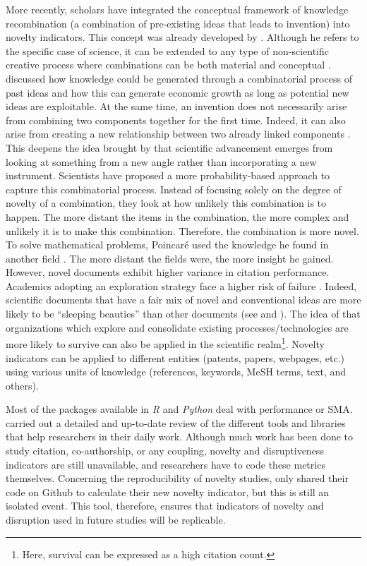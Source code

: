 More recently, scholars have integrated the conceptual framework of knowledge recombination (a combination of pre-existing ideas that leads to invention) into novelty indicators. This concept was already developed by \cite{poincare1910mathematical}. Although he refers to the specific case of science, it can be extended to any type of non-scientific creative process where combinations can be both material and conceptual \citep{winter1982evolutionary}. \cite{weitzman1998recombinant} discussed how knowledge could be generated through a combinatorial process of past ideas and how this can generate economic growth as long as potential new ideas are exploitable. At the same time, an invention does not necessarily arise from combining two components together for the first time. Indeed, it can also arise from creating a new relationship between two already linked components \citep{schumpeter1939business, henderson1990architectural}. This deepens the idea brought by \cite{jacob1977evolution} that scientific advancement emerges from looking at something from a new angle rather than incorporating a new instrument. Scientists have proposed a more probability-based approach to capture this combinatorial process. Instead of focusing solely on the degree of novelty of a combination, they look at how unlikely this combination is to happen. The more distant the items in the combination, the more complex and unlikely it is to make this combination. Therefore, the combination is more novel. To solve mathematical problems, Poincaré used the knowledge he found in another field \citep{poincare1910mathematical}. The more distant the fields were, the more insight he gained. However, novel documents exhibit higher variance in citation performance. Academics adopting an exploration strategy face a higher risk of failure \citep{fleming2001recombinant,foster2015tradition,wang2017bias, ocde}. Indeed, scientific documents that have a fair mix of novel and conventional ideas are more likely to be ``sleeping beauties'' than other documents (see \cite{ke2015defining} and \cite{wang2017bias}). The idea of \cite{march1991exploration} that organizations which explore and consolidate existing processes/technologies are more likely to survive can also be applied in the scientific realm\footnote{\justifying Here, survival can be expressed as a high citation count.}. Novelty indicators can be applied to different entities (patents, papers, webpages, etc.) using various units of knowledge (references, keywords, MeSH terms, text, and others).

Most of the packages available in \textit{R} and \textit{Python} deal with performance or SMA. \cite{moral2020software} carried out a detailed and up-to-date review of the different tools and libraries that help researchers in their daily work. Although much work has been done to study citation, co-authorship, or any coupling, novelty and disruptiveness indicators are still unavailable, and researchers have to code these metrics themselves. Concerning the reproducibility of novelty studies, only \cite{shibayama2021measuring} shared their code on Github to calculate their new novelty indicator, but this is still an isolated event. This tool, therefore, ensures that indicators of novelty and disruption used in future studies will be replicable.

